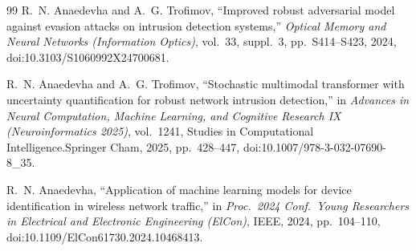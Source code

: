 \documentclass[journal,twoside]{IEEEtran}
\begin{document}
\begin{thebibliography}{99}
R.~N. Anaedevha and A.~G. Trofimov,
``Improved robust adversarial model against evasion attacks on intrusion
detection systems,''
\emph{Optical Memory and Neural Networks (Information Optics)}, vol.~33,
suppl.~3, pp.~S414--S423, 2024, doi:10.3103/S1060992X24700681.

R.~N. Anaedevha and A.~G. Trofimov,
``Stochastic multimodal transformer with uncertainty quantification for
robust network intrusion detection,''
in \emph{Advances in Neural Computation, Machine Learning, and Cognitive
Research IX (Neuroinformatics 2025)}, vol.~1241, Studies in Computational
Intelligence.\quad Springer Cham, 2025, pp.~428--447,
doi:10.1007/978-3-032-07690-8\_35.

R.~N. Anaedevha,
``Application of machine learning models for device identification in
wireless network traffic,''
in \emph{Proc.\ 2024 Conf.\ Young Researchers in Electrical and Electronic
Engineering (ElCon)}, IEEE, 2024, pp.~104--110,
doi:10.1109/ElCon61730.2024.10468413.

\end{thebibliography}
\end{document}
